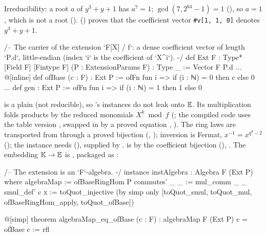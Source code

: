 
Irreducibility: a root $a$ of $y^3+y+1$ has $a^7 = 1$; $\gcd(7, 2^{64}-1) = 1$
(), so $a = 1$, which is not a root ().
 () proves that the coefficient vector
\texttt{\#v[1, 1, 0]} denotes $y^3 + y + 1$.

\begin{leancode}
/--
The carrier of the extension `F[X] / f`: a dense coefficient vector of length `P.d`,
little-endian (index `i` is the coefficient of `X^i`).
-/
def Ext {F : Type*} [Field F] [Fintype F] (P : ExtensionParams F) : Type _ := Vector F P.d
...
@[inline] def ofBase (c : F) : Ext P := ofFn fun i => if (i : ℕ) = 0 then c else 0
...
def gen : Ext P := ofFn fun i => if (i : ℕ) = 1 then 1 else 0
\end{leancode}


 is a plain  (not reducible), so 's instances do not leak onto
$\mathbb{E}$. Its multiplication folds products by the reduced monomials $X^k \bmod f$
(; the compiled code uses the table version , swapped in by a
proved  equation , ). The ring laws are
transported from  through a proved bijection
(\allowbreak{}, ); inversion is Fermat,
$x^{-1} = x^{q^d - 2}$ (); the  instance needs
\lean{[Fact (Irreducible P.}\allowbreak\lean{poly)]} (), supplied by .
 is by the coefficient bijection (),
\allowbreak{}\allowbreak{}\allowbreak{}. The embedding $\mathbb{K} \to \mathbb{E}$ is
, packaged as :

\begin{leancode}
/-- The extension is an `F`-algebra. -/
instance instAlgebra : Algebra F (Ext P) where
  algebraMap := ofBaseRingHom P
  commutes' _ _ := mul_comm _ _
  smul_def' c x :=
    toQuot_injective (by simp only [toQuot_smul, toQuot_mul, ofBaseRingHom_apply, toQuot_ofBase])

@[simp] theorem algebraMap_eq_ofBase (c : F) : algebraMap F (Ext P) c = ofBase c := rfl
\end{leancode}

